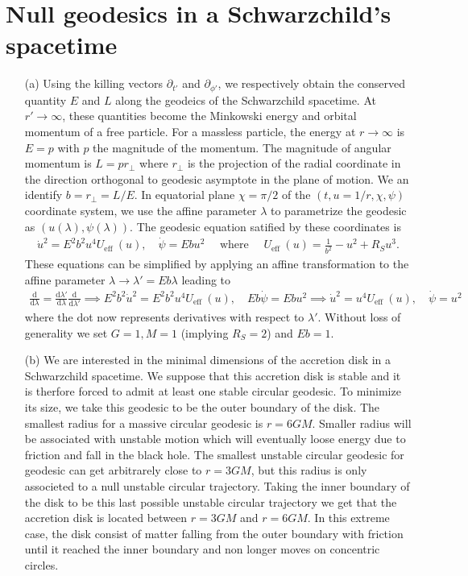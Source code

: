 \documentclass[10pt, a4paper]{article}
\begin{document}
\section{Null geodesics in a Schwarzchild's spacetime}
\begin{enumerate}
  \item[(a)] Using the killing vectors $\partial_{t'}$ and $\partial_{\phi'}$, we respectively obtain the conserved quantity $E$ and $L$ along the geodeics of the Schwarzchild spacetime. At $r' \to \infty$, these quantities become the Minkowski energy and orbital momentum of a free particle. For a massless particle, the energy at $r\to \infty$ is $E = p$ with $p$ the magnitude of the momentum. The magnitude of angular momentum is $L = p r_\perp$ where $r_\perp$ is the projection of the radial coordinate in the direction orthogonal to geodesic asymptote in the plane of motion. We an identify  $b = r_\perp = L/E$. In equatorial plane $\chi = \pi/2$ of the $(t, u = 1/r, \chi, \psi)$ coordinate system, we use the affine parameter $\lambda$ to parametrize the geodesic as $(u(\lambda), \psi(\lambda))$. The geodesic equation satified by these coordinates is 
  \begin{align*}
    \dot{u}^2=E^2 b^2 u^4 U_{\text {eff }}(u), \quad \dot{\psi}=E b u^2 \quad \text{ where }\quad U_{\text {eff }}(u)=\frac{1}{b^2}-u^2+R_S u^3.
  \end{align*}
  These equations can be simplified by applying an affine transformation to the affine parameter $\lambda \to \lambda' = Eb \lambda$ leading to 
  \begin{align*}
    \frac{\text{d}}{\text{d}\lambda}  =  \frac{\text{d}\lambda'}{\text{d}\lambda} \frac{\text{d}}{\text{d}\lambda'} \implies  E^2 b^2\dot{u}^2= E^2 b^2 u^4 U_{\text {eff }}(u), \quad Eb\dot{\psi}= Eb u^2\implies \dot{u}^2= u^4 U_{\text {eff }}(u), \quad \dot{\psi}= u^2
  \end{align*}
  where the dot now represents derivatives with respect to $\lambda'$. Without loss of generality we set $G = 1, M = 1$ (implying $R_S=2$) and $Eb = 1$. 
  \item[(b)] We are interested in the minimal dimensions of the accretion disk in a Schwarzchild spacetime. We suppose that this accretion disk is stable and it is therfore forced to admit at least one stable circular geodesic. To minimize its size, we take this geodesic to be the outer boundary of the disk. The smallest radius for a massive circular geodesic is $r=6GM$. Smaller radius will be associated with unstable motion which will eventually loose energy due to friction and fall in the black hole. The smallest unstable circular geodesic for geodesic can get arbitrarely close to $r=3GM$, but this radius is only associeted to a null unstable circular trajectory. Taking the inner boundary of the disk to be this last possible unstable circular trajectory we get that the accretion disk is located between $r=3GM$ and $r=6GM$. In this extreme case, the disk consist of matter falling from the outer boundary with friction until it reached the inner boundary and non longer moves on concentric circles.  

\end{enumerate}
\end{document}
